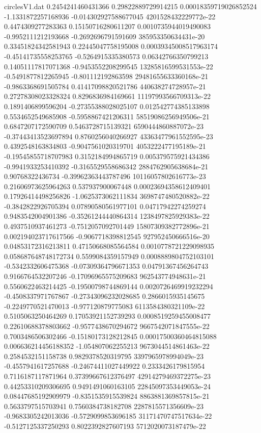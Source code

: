 \begin{filecontents}{circlesV1.dat}
0.2454241460431366	0.29822889729914215	0.00018359719026852524
-1.1331872257168936	-0.014302927588677045	4201528432229772e-22
0.4474309277283363	0.15150716280611207	0.0010735944019490083
-0.9952111212193668	-0.2692696791591609	385953350634431e-20
0.33451824342581943	0.22445047758195008	0.00039345008517963174
-0.45141735558253765	-0.5264915335380573	0.06342766350799213
0.14051117817071368	-0.9453552208299545	13285816599531553e-22
-0.5491877812265945	-0.801112192863598	29481655633360168e-21
-0.9863368691505784	0.41417098820521786	440638274728957e-21
0.27278308023328324	0.8296836984169661	11197993566709313e-22
0.1891406899596204	-0.27355388028025107	0.012542774385133898
0.5534652549685908	-0.5958867421206311	58519086256949506e-21
0.6847207172590709	0.5463728715139321	6590444860887072e-23
-0.37443413523697894	0.8760256040266927	43363477961552595e-23
0.4392548163834803	-0.9047561020319701	4053222477195189e-21
-0.19545855718707983	0.3152184994865719	0.005379575921434386
-0.9941933253410392	-0.3165529558686342	2884762905638684e-21
0.90768322436734	-0.39962363443787496	10116057802616773e-23
0.21606973625964263	0.537937900067448	0.00023694358612409401
0.17926414498256826	-1.0625373062111834	3698747480520882e-22
-0.3842822926705394	0.07890580561977101	0.04717942274259274
0.9483542004901386	-0.35261244440864314	1238497825929383e-22
0.4937510937461273	-0.7512057092701449	15807309382772896e-21
0.002194023717617566	-0.9067718398812545	927952450666516e-20
0.04853172316213811	0.47150668085564584	0.0010778721229098935
0.058687648748172734	0.5599084359157949	0.0008889804752103101
-0.5342332606475368	-0.07309364796671353	0.04791367456264743
0.9166764532207246	-0.17096965575209683	962543774948631e-21
0.5560622463214425	-0.19500798744869144	0.0020726469919232294
-0.4508337971767867	-0.27343096232028685	0.2866015935145675
-0.2249770521470013	-0.977120879775083	6113584380321109e-22
0.5105063250464269	0.17053921152739293	0.0008519259455008477
0.22610688378803662	-0.9577438670294672	9667542071847555e-22
0.7003486506302466	-0.15180173128212845	0.00017500360464815088
0.006636214456188352	-1.054807062255213	9673044514861463e-22
0.2584532151158738	0.9829378520319795	3397965978994049e-23
-0.4557941617257688	-0.24674411027449922	0.2333426179815954
0.7116187117871964	0.37399667612376497	42914279469372275e-23
0.44253310209306695	0.9491491060163105	22845097353449053e-24
0.08447685192909979	-0.8351535915539824	8863881369857815e-21
0.5633797515703941	0.7560384738182708	2287815571356609e-23
-0.9683305242013036	-0.5729099853696185	31171470747517634e-22
-0.5127125337250293	0.8022392827607193	5712020073187479e-22

\end{filecontents}
